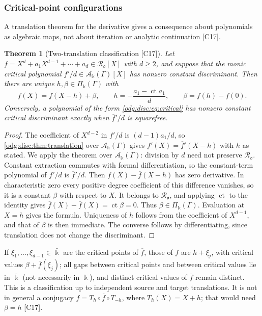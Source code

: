 \documentclass[11pt,oneside]{article}
\numberwithin{equation}{section}
\newtheorem{theorem}{Theorem}[section]
\theoremstyle{definition}
\theoremstyle{remark}
\newcommand{\ct}{\operatorname{ct}}
\newcommand{\src}[1]{\textup{\textsf{\small[#1]}}}
\newcommand{\crA}{\mathcal A_\Bbbk(\Gamma)}
\newcommand{\crP}{\Pi_\Bbbk(\Gamma)}
\begin{document}
\subsubsection{Critical-point configurations}\label{odg:disc:sub:critical}

A translation theorem for the derivative gives a consequence about polynomials as
algebraic maps, not about iteration or analytic continuation \src{C17}.

\begin{theorem}[Two-translation classification \src{C17}]\label{odg:disc:thm:critical}
Let $f=X^d+a_1X^{d-1}+\cdots+a_d\in\mathcal R_{\mathfrak o}[X]$ with $d\ge2$, and suppose
that the monic critical polynomial $f'/d\in\crA[X]$ has nonzero constant discriminant.
Then there are unique $h,\beta\in\crP$ with
\begin{equation}\label{odg:disc:eq:critical}
 f(X)=\overline f(X-h)+\beta,\qquad
 h=-\frac{a_1-\ct a_1}{d},\qquad \beta=f(h)-\overline f(0).
\end{equation}
Conversely, a polynomial of the form \eqref{odg:disc:eq:critical} has nonzero constant
critical discriminant exactly when $\overline f'/d$ is squarefree.
\end{theorem}
\begin{proof}
The coefficient of $X^{d-2}$ in $f'/d$ is $(d-1)a_1/d$, so
\cref{odg:disc:thm:translation} over $\crA$ gives $f'(X)=\overline f'(X-h)$ with $h$ as
stated. We apply the theorem over $\crA$: division by $d$ need not preserve
$\mathcal R_{\mathfrak o}$. Constant extraction commutes with formal differentiation,
so the constant-term polynomial of $f'/d$ is $\overline f'/d$.
Then $f(X)-\overline f(X-h)$ has zero derivative. In characteristic zero every positive
degree coefficient of this difference vanishes, so it is a constant $\beta$ with
respect to $X$. It belongs to $\mathcal R_{\mathfrak o}$, and applying $\ct$ to the
identity gives $\overline f(X)-\overline f(X)=\ct\beta=0$. Thus $\beta\in\crP$.
Evaluation at $X=h$ gives the formula. Uniqueness of $h$ follows from the
coefficient of $X^{d-1}$, and that of $\beta$ is then immediate. The converse follows by
differentiating, since translation does not change the discriminant.
\end{proof}

If $\xi_1,\ldots,\xi_{d-1}\in\bar\Bbbk$ are the critical points of $\overline f$, those of $f$ are
$h+\xi_j$, with critical values $\beta+\overline f(\xi_j)$; all gaps between critical
points and between critical values lie in $\bar\Bbbk$ (not necessarily in $\Bbbk$), and distinct critical values of
$\overline f$ remain distinct. This is a classification up to independent source and
target translations. It is not in general a conjugacy $f=T_h\circ\overline f\circ T_{-h}$,
where $T_h(X)=X+h$; that would need $\beta=h$ \src{C17}.
\end{document}
